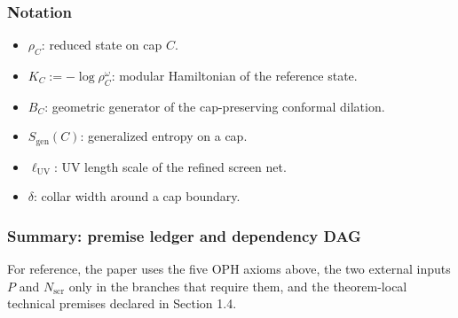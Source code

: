 \subsubsection{Notation}\label{15-notation}

\begin{itemize}
\tightlist
\item
  \(\rho_C\): reduced state on cap \(C\).
\item
  \(K_C := -\log \rho_C^{\omega}\): modular Hamiltonian of the reference state.
\item
  \(B_C\): geometric generator of the cap-preserving conformal dilation.
\item
  \(S_{\mathrm{gen}}(C)\): generalized entropy on a cap.
\item
  \(\ell_{\mathrm{UV}}\): UV length scale of the refined screen net.
\item
  \(\delta\): collar width around a cap boundary.
\end{itemize}

\subsubsection{Summary: premise ledger and dependency DAG}\label{16-summary-complete-axiom-set}

For reference, the paper uses the five OPH axioms above, the two external inputs \(P\) and \(N_{\mathrm{scr}}\) only in the branches that require them, and the theorem-local technical premises declared in Section 1.4.

